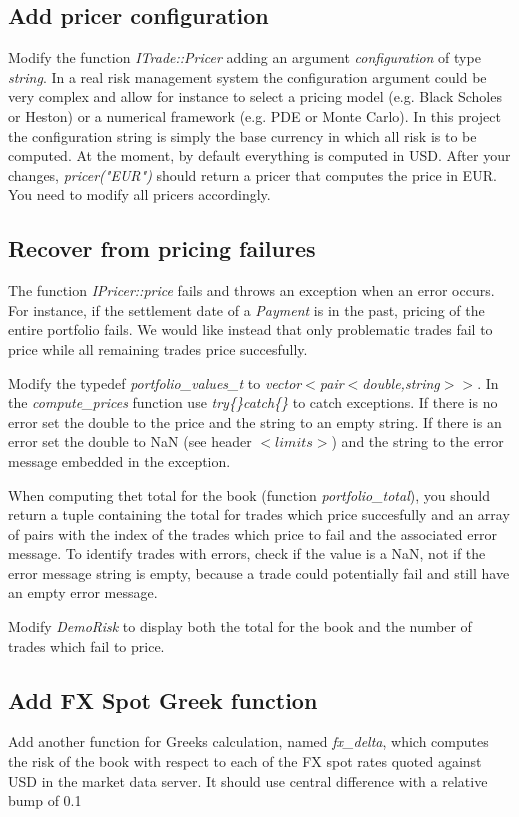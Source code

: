 \documentclass[10pt]{article}
\begin{document}
\subsection{Add pricer configuration}
Modify the function \textit{ITrade::Pricer} adding an argument \textit{configuration} of type \textit{string}. In a real risk management system the configuration argument could be very complex and allow for instance to select a pricing model (e.g. Black Scholes or Heston) or a numerical framework (e.g. PDE or Monte Carlo). In this project the configuration string is simply the base currency in which all risk is to be computed. At the moment, by default everything is computed in USD. After your changes, \textit{pricer("EUR")} should return a pricer that computes the price in EUR.\\

You need to modify all pricers accordingly.

\subsection{Recover from pricing failures}
The function \textit{IPricer::price} fails and throws an exception when an error occurs. For instance, if the settlement date of a \textit{Payment} is in the past, pricing of the entire portfolio fails. We would like instead that only problematic trades fail to price while all remaining trades price succesfully.

Modify the typedef \textit{portfolio\_values\_t} to \textit{vector$<$pair$<$double,string$>>$}. In the \textit{compute\_prices} function use \textit{try\{\}catch\{\}} to catch exceptions. If there is no error set the double to the price and the string to an empty string. If there is an error set the double to NaN (see header $<limits>$) and the string to the error message embedded in the exception.

When computing thet total for the book (function \textit{portfolio\_total}), you should return a tuple containing the total for trades which price succesfully and an array of pairs with the index of the trades which price to fail and the associated error message. To identify trades with errors, check if the value is a NaN, not if the error message string is empty, because a trade could potentially fail and still have an empty error message.

Modify \textit{DemoRisk} to display both the total for the book and the number of trades which fail to price.

\subsection{Add FX Spot Greek function}
\label{sec:fxdelta}
Add another function for Greeks calculation, named \textit{fx\_delta}, which computes the risk of the book with respect to each of the FX spot rates quoted against USD in the market data server. It should use central difference with a relative bump of 0.1%
\end{document}
